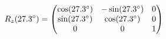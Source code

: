 \documentclass[preview]{standalone}
\begin{document}
\begin{align*}
\special{dvisvgm:raw <g id='unique000'>}R_z(27.3^\circ) = \begin{pmatrix} \cos(27.3^\circ) & -\sin(27.3^\circ) & 0 \\ \sin(27.3^\circ) & \cos(27.3^\circ) & 0 \\ 0 & 0 & 1 \end{pmatrix}\special{dvisvgm:raw </g>}
\end{align*}
\end{document}
